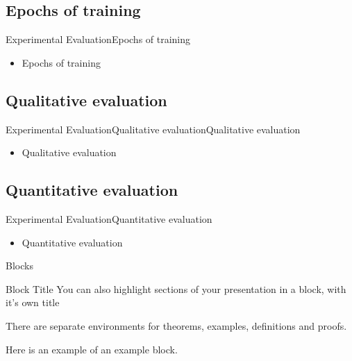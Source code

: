 \documentclass{beamer}
\begin{document}
\begin{CJK}{UTF8}{}
\subsection{Epochs of training}

\begin{frame}{Experimental Evaluation}{Epochs of training}
	\begin{itemize}
	\item{
		Epochs of training
	}
	\end{itemize}
\end{frame}

\subsection{Qualitative evaluation}

\begin{frame}{Experimental Evaluation}{Qualitative evaluationQualitative evaluation}
	\begin{itemize}
	\item{
		Qualitative evaluation
	}
	\end{itemize}
\end{frame}

\subsection{Quantitative evaluation}

\begin{frame}{Experimental Evaluation}{Quantitative evaluation}
	\begin{itemize}
	\item{
		Quantitative evaluation
	}
	\end{itemize}
\end{frame}


\begin{frame}{Blocks}
\begin{block}{Block Title}
You can also highlight sections of your presentation in a block, with it's own title
\end{block}
\begin{theorem}
There are separate environments for theorems, examples, definitions and proofs.
\end{theorem}
\begin{example}
Here is an example of an example block.
\end{example}
\end{frame}


\end{CJK}
\end{document}
